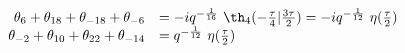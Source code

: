 \begin{equation}
  \begin{array}{rl}
    \theta_6 + \theta_{18} + \theta_{-18} + \theta_{-6} &= -i
    q^{-{1\over 16}}~ \th_4({-{\tau\over 4}}|{3\tau\over 2})
    = -i q^{-{1\over 12}}~ \eta({\tau\over 2}) \\
\theta_{-2} + \theta_{10} + \theta_{22} + \theta_{-14} &= 
    q^{-{1\over 12}}~ \eta({\tau\over 2}) 
  \end{array}
\end{equation}

